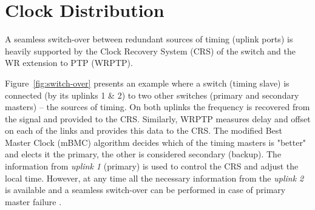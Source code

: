 \section{Clock Distribution}




A seamless switch-over between redundant sources of timing (uplink ports) is heavily supported by 
the Clock Recovery System (CRS) \cite{biblio:TomekMSc} of the switch and the WR extension to PTP 
(WRPTP)\cite{biblio:WRPTP}. 

Figure~\ref{fig:switch-over} presents an example where a switch (timing slave) is connected 
(by its uplinks 1 \& 2) 
to two other switches (primary and secondary masters) -- the sources of timing. On both 
uplinks the frequency is recovered from the signal and provided to the CRS. Similarly, WRPTP 
measures delay and offset on each of the links and provides this data to the CRS. 
The modified Best Master Clock (mBMC) algorithm \cite{biblio:WRPTP} decides which of the 
timing masters is "better" and elects it the primary, the other is considered secondary (backup).
The information from {\it uplink 1} (primary) is used to control 
the CRS and adjust the local time. However, at any time all the necessary information from the 
{\it uplink 2} is available and a seamless switch-over can be performed in case of 
primary master failure \cite{biblio:TomekMSc}.

